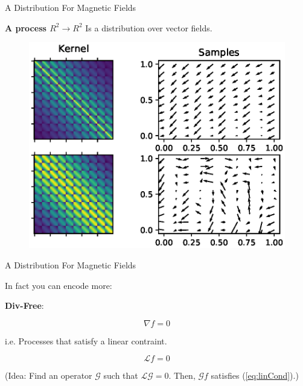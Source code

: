 \documentclass{beamer}
\begin{document}
\begin{frame}{A Distribution For Magnetic Fields}

  \textbf{A process $R^2 \rightarrow R^2$} Is a distribution over vector fields.
  \begin{figure}
    \includegraphics[width=\linewidth]{plots/vector_fields.eps}
  \end{figure}

\end{frame}


\begin{frame}{A Distribution For Magnetic Fields}

  In fact you can encode more:

  \vspace{1em}

  \textbf{Div-Free}:

  \begin{equation*}
    \nabla f = 0
  \end{equation*}

  i.e. Processes that satisfy a linear contraint.

  \begin{equation}\label{eq:linCond}
    \mathcal{L}f = 0
  \end{equation}

  (Idea: Find an operator $\mathcal{G}$ such that $\mathcal{L}\mathcal{G} = 0$. Then, $\mathcal{G}f$ satisfies (\ref{eq:linCond}).)
\end{frame}
\end{document}
